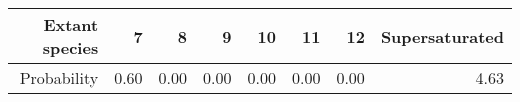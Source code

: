 \begin{table}[ht]
\centering
\begin{tabular}{rrrrrrrr}
  \hline
Extant species & 7 & 8 & 9 & 10 & 11 & 12 & Supersaturated \\ 
  \hline
Probability & 0.60 & 0.00 & 0.00 & 0.00 & 0.00 & 0.00 & 4.63 \\ 
   \hline
\end{tabular}
\end{table}

